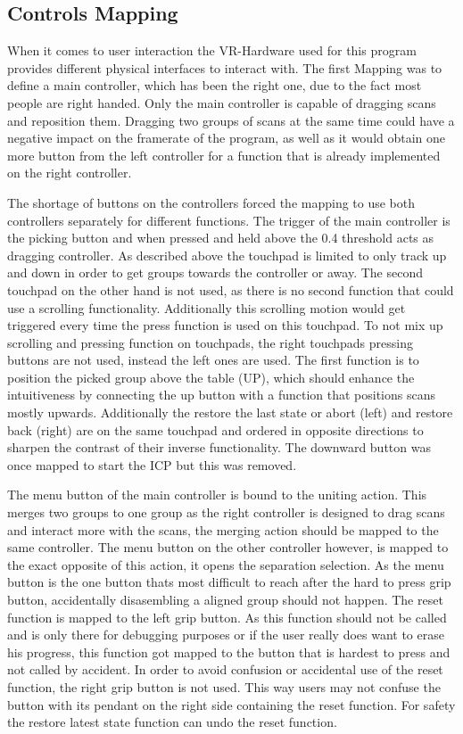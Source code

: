 \documentclass[hyperref,english,bachelorofscience,bibnum,twoside]{cgvpub}
\begin{document}
\subsection{Controls Mapping}

When it comes to user interaction the VR-Hardware used for this program provides different physical interfaces to interact with. 
The first Mapping was to define a main controller, which has been the right one, due to the fact most people are right handed. Only the main controller is capable of dragging scans and reposition them.
Dragging two groups of scans at the same time could have a negative impact on the framerate of the program, as well as it would obtain one more button from the left controller for a function that is already implemented on the right controller.

The shortage of buttons on the controllers forced the mapping to use both controllers separately for different functions. The trigger of the main controller is the picking button and when pressed and held above the 0.4 threshold acts as dragging controller. As described above the touchpad is limited to only track up and down in order to get groups towards the controller or away. The second touchpad on the other hand is not used, as there is no second function that could use a scrolling functionality. Additionally this scrolling motion would get triggered every time the press function is used on this touchpad. To not mix up scrolling and pressing function on touchpads, the right touchpads pressing buttons are not used, instead the left ones are used. The first function is to position the picked group above the table (UP), which should enhance the intuitiveness by connecting the up button with a function that positions scans mostly upwards. Additionally the restore the last state or abort (left) and restore back (right) are on the same touchpad and ordered in opposite directions to sharpen the contrast of their inverse functionality. The downward button was once mapped to start the ICP but this was removed.

The menu button of the main controller is bound to the uniting action. This merges two groups to one group as the right controller is designed to drag scans and interact more with the scans, the merging action should be mapped to the same controller.
The menu button on the other controller however, is mapped to the exact opposite of this action, it opens the separation selection. As the menu button is the one button thats most difficult to reach after the hard to press grip button, accidentally disasembling a aligned group should not happen.
The reset function is mapped to the left grip button. As this function should not be called and is only there for debugging purposes or if the user really does want to erase his progress, this function got mapped to the button that is hardest to press and not called by accident.
In order to avoid confusion or accidental use of the reset function, the right grip button is not used. This way users may not confuse the button with its pendant on the right side containing the reset function. For safety the restore latest state function can undo the reset function.
\end{document}
